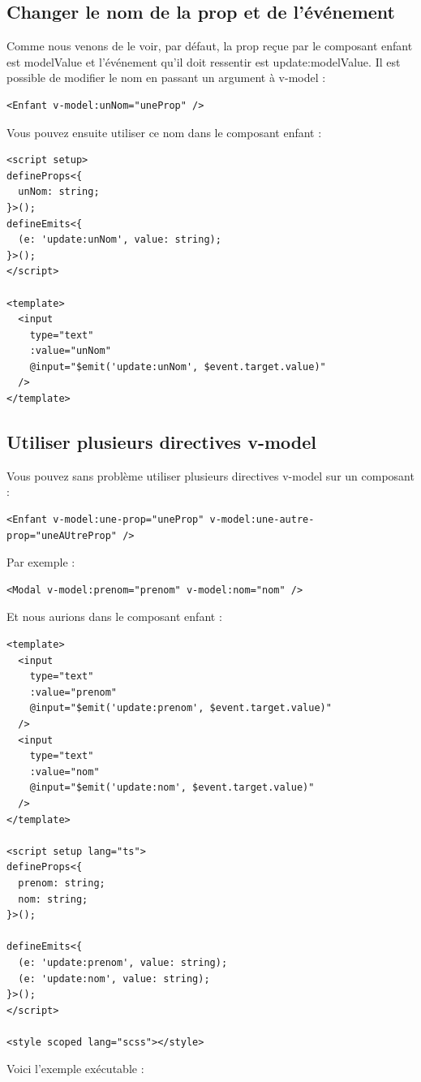 \subsection{Changer le nom de la {\color{monOrange}prop} et de l'événement}
Comme nous venons de le voir, par défaut, la {\color{monOrange}prop} reçue par le composant enfant est {\color{monOrange}modelValue} et l'événement qu'il doit ressentir est {\color{monOrange}update:modelValue}. Il est possible de modifier le nom en passant un argument à {\color{monOrange}v-model} :
\begin{verbatim}
<Enfant v-model:unNom="uneProp" />
\end{verbatim}
Vous pouvez ensuite utiliser ce nom dans le composant enfant :
\begin{verbatim}
<script setup>
defineProps<{
  unNom: string;
}>();
defineEmits<{
  (e: 'update:unNom', value: string);
}>();
</script>

<template>
  <input
    type="text"
    :value="unNom"
    @input="$emit('update:unNom', $event.target.value)"
  />
</template>
\end{verbatim}
\subsection{Utiliser plusieurs directives {\color{monOrange}v-model}}
Vous pouvez sans problème utiliser plusieurs directives v-model sur un composant :
\begin{verbatim}
<Enfant v-model:une-prop="uneProp" v-model:une-autre-prop="uneAUtreProp" />
\end{verbatim}
Par exemple :
\begin{verbatim}
<Modal v-model:prenom="prenom" v-model:nom="nom" />
\end{verbatim}
Et nous aurions dans le composant enfant :
\begin{verbatim}
<template>
  <input
    type="text"
    :value="prenom"
    @input="$emit('update:prenom', $event.target.value)"
  />
  <input
    type="text"
    :value="nom"
    @input="$emit('update:nom', $event.target.value)"
  />
</template>

<script setup lang="ts">
defineProps<{
  prenom: string;
  nom: string;
}>();

defineEmits<{
  (e: 'update:prenom', value: string);
  (e: 'update:nom', value: string);
}>();
</script>

<style scoped lang="scss"></style>
\end{verbatim}
Voici l'exemple exécutable :


